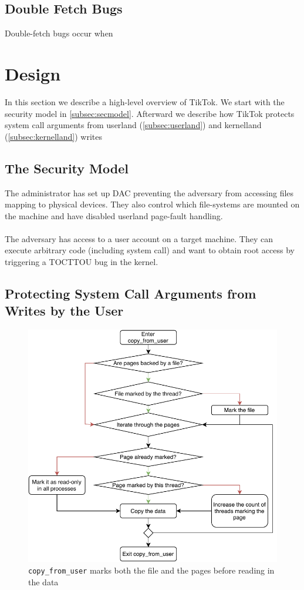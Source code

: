 \subsection{Double Fetch Bugs}

Double-fetch bugs occur when

\label{sec:doublefetch}

\section{Design}
\label{sec:design}
In this section we describe a high-level overview of TikTok. We start with the security model in \autoref{subsec:secmodel}.
Afterward we describe how TikTok protects system call arguments from userland (\autoref{subsec:userland}) and kernelland 
(\autoref{subsec:kernelland}) writes

\subsection{The Security Model}
\label{subsec:secmodel}
The administrator has set up DAC preventing the adversary from accessing files mapping to physical devices.
They also control which file-systems are mounted on the machine and have disabled userland page-fault handling.
\\
\\
The adversary has access to a user account on a target machine. They can execute arbitrary code (including system call)
and want to obtain root access by triggering a TOCTTOU bug in the kernel.

\subsection{Protecting System Call Arguments from Writes by the User}
\label{subsec:userland}
\begin{figure}[]
  \centering
  \includegraphics[width = .45 \textwidth]{img/copy_from_user.pdf}
  \caption{\texttt{copy\_from\_user} marks both the file and the pages before reading in the data}
  \label{fig:pagetable}
\end{figure}

